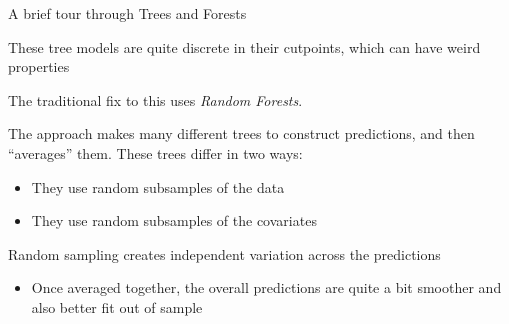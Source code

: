 \documentclass[notes,11pt, aspectratio=169]{beamer}
\newenvironment{wideitemize}{\itemize\addtolength{\itemsep}{10pt}}{\enditemize}
\begin{document}
\begin{frame}{A brief tour through Trees and Forests}
  \begin{wideitemize}
  \item These tree models are quite discrete in their cutpoints, which can have weird properties
  \item The traditional fix to this uses \emph{Random Forests}.
  \item The approach makes many different trees to construct
    predictions, and then ``averages'' them. These trees differ in two ways:
    \begin{itemize}
    \item They use random subsamples of the data
    \item They use random subsamples of the covariates
    \end{itemize}
  \item Random sampling creates independent variation across the predictions
    \begin{itemize}
    \item Once averaged together, the overall predictions are quite a
      bit smoother and also better fit out of sample
    \end{itemize}
  \end{wideitemize}
\end{frame}
\end{document}
